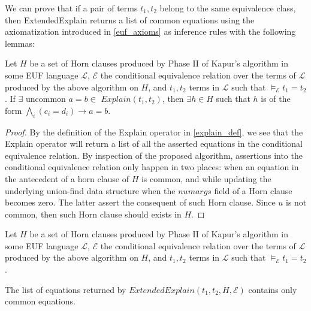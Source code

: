 

We can prove that if a pair of terms $t_1, t_2$ belong
to the same equivalence class, then ExtendedExplain returns
a list of common equations 
using the axiomatization introduced in \ref{euf_axioms} as 
inference rules with the following lemmas:

\begin{lemma} \label{existence_horn_in_explain}
  Let $H$ be a set of Horn clauses produced by Phase II
  of Kapur's algorithm in some EUF language $\mathcal{L}$, 
  $\mathcal{E}$ the conditional 
  equivalence relation over the terms of 
  $\mathcal{L}$ produced by the above algorithm on $H$,
  and $t_1, t_2$ terms in 
  $\mathcal{L}$ such that
  $\models_{\mathcal{E}} t_1 = t_2$.
  If $\exists \text{ uncommon } a = b \in$
  $Explain(t_1, t_2)$, then $\exists h \in H$ such 
  that $h$ is of the form 
  $\bigwedge_i (c_i = d_i) \rightarrow a = b$.
\end{lemma}

\begin{proof}
  By the definition of the Explain operator in \ref{explain_def},
  we see that the Explain operator will return a
  list of all the asserted equations in the conditional
  equivalence relation. By inspection of the proposed
  algorithm, assertions into the conditional equivalence
  relation only happen in two places: when an equation 
  in the antecedent of a horn clause of $H$ is common, 
  and while updating the underlying union-find data structure
  when the $numargs$ field of a Horn clause becomes
  zero. The latter assert the consequent of such Horn clause.
  Since $u$ is not common, then such Horn clause 
  should exists in $H$.
\end{proof}

\begin{lemma}

  Let $H$ be a set of Horn clauses produced by Phase II
  of Kapur's algorithm in some EUF language 
  $\mathcal{L}$, $\mathcal{E}$ the conditional 
  equivalence relation over the terms of 
  $\mathcal{L}$ produced by the above algorithm on $H$,
  and $t_1, t_2$ terms in 
  $\mathcal{L}$ such that
  $\models_{\mathcal{E}} t_1 = t_2$.

  The list of equations returned by $ExtendedExplain(t_1, t_2, 
  H, \mathcal{E})$ contains only common equations.
\end{lemma}

